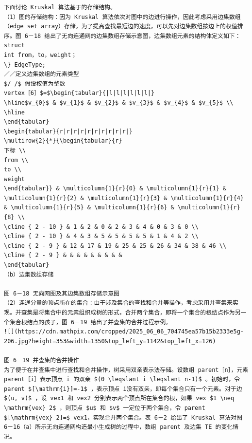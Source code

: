 \documentclass[10pt]{article}
\begin{document}
\begin{verbatim}
下面讨论 Kruskal 算法基于的存储结构。
（1）图的存储结构：因为 Kruskal 算法依次对图中的边进行操作，因此考虑采用边集数组（edge set array）存储。为了提高查找最短边的速度，可以先对边集数组按边上的权值排序。图 6－18 给出了无向连通网的边集数组存储示意图，边集数组元素的结构体定义如下：
struct
int from，to，weight；
\} EdgeType;
／／定义边集数组的元素类型
$/ /$ 假设权值为整数
vertex［6］$=$\begin{tabular}{|l|l|l|l|l|l|}
\hline$v_{0}$ & $v_{1}$ & $v_{2}$ & $v_{3}$ & $v_{4}$ & $v_{5}$ \\
\hline
\end{tabular}
\begin{tabular}{r|r|r|r|r|r|r|r|r|r|}
\multirow{2}{*}{\begin{tabular}{r} 
下标 \\
from \\
to \\
weight
\end{tabular}} & \multicolumn{1}{r}{0} & \multicolumn{1}{r}{1} & \multicolumn{1}{r}{2} & \multicolumn{1}{r}{3} & \multicolumn{1}{r}{4} & \multicolumn{1}{r}{5} & \multicolumn{1}{r}{6} & \multicolumn{1}{r}{8} \\
\cline { 2 - 10 } & 1 & 2 & 0 & 2 & 3 & 4 & 0 & 3 & 0 \\
\cline { 2 - 10 } & 4 & 3 & 5 & 5 & 5 & 5 & 1 & 4 & 2 \\
\cline { 2 - 9 } & 12 & 17 & 19 & 25 & 25 & 26 & 34 & 38 & 46 \\
\cline { 2 - 9 } & & & & & & & & &
\end{tabular}
（b）边集数组存储

图 6－18 无向网图及其边集数组存储示意图
（2）连通分量的顶点所在的集合：由于涉及集合的查找和合并等操作，考虑采用并查集来实现。并查集是将集合中的元素组织成树的形式，合并两个集合，即将一个集合的根结点作为另一个集合根结点的孩子，图 6－19 给出了并查集的合并过程示例。
![](https://cdn.mathpix.com/cropped/2025_06_06_704745ea57b15b2333e5g-206.jpg?height=353&width=1350&top_left_y=1142&top_left_x=126)

图 6－19 并查集的合并操作
为了便于在并查集中进行查找和合并操作，树采用双亲表示法存储。设数组 parent［n］，元素 parent［i］表示顶点 i 的双亲 $(0 \leqslant i \leqslant n-1)$ 。初始时，令 parent $[\mathrm{i}]=-1$ ，表示顶点 i没有双亲，即每个集合只有一个元素。对于边 $(u, v)$ ，设 vex1 和 vex2 分别表示两个顶点所在集合的根，如果 vex $1 \neq \mathrm{vex} 2$ ，则顶点 $u$ 和 $v$ 一定位于两个集合，令 parent $[\mathrm{vex} 2]=$ vex1，实现合并两个集合。表 6－2 给出了 Kruskal 算法对图 6－16（a）所示无向连通网构造最小生成树的过程中，数组 parent 及边集 TE 的变化情况。


\end{verbatim}
\end{document}
